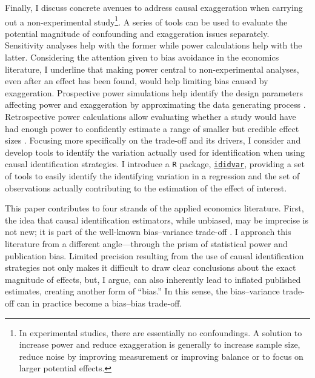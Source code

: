 			Finally, I discuss concrete avenues to address causal exaggeration when carrying out a non-experimental study\footnote{In experimental studies, there are essentially no confoundings. A solution to increase power and reduce exaggeration is generally to increase sample size, reduce noise by improving measurement or improving balance or to focus on larger potential effects.}. A series of tools can be used to evaluate the potential magnitude of confounding and exaggeration issues separately. Sensitivity analyses help with the former while power calculations help with the latter. %
			Considering the attention given to bias avoidance in the economics literature, I underline that making power central to non-experimental analyses, even after an effect has been found, would help limiting bias caused by exaggeration. Prospective power simulations help identify the design parameters affecting power and exaggeration by approximating the data generating process \citep{gelman_regression_2020, black_simulated_2022}. Retrospective power calculations allow evaluating whether a study would have had enough power to confidently estimate a range of smaller but credible effect sizes \citep{gelman_beyond_2014, stommesReliability2023}.
			Focusing more specifically on the trade-off and its drivers, I consider and develop tools to identify the variation actually used for identification when using causal identification strategies. %
			I introduce a \verb?R? package, \href{https://vincentbagilet.github.io/ididvar/}{\verb?ididvar?}, providing a set of tools to easily identify the identifying variation in a regression and the set of observations actually contributing to the estimation of the effect of interest.
						
			This paper contributes to four strands of the applied economics literature. First, the idea that causal identification estimators, while unbiased, may be imprecise is not new; it is part of the well-known bias–variance trade-off \citep{imbens_optimal_2012, deaton_understanding_2018, hernan_causal_2020, ravallion_should_2020}. I approach this literature from a different angle—through the prism of statistical power and publication bias. Limited precision resulting from the use of causal identification strategies not only makes it difficult to draw clear conclusions about the exact magnitude of effects, but, I argue, can also inherently lead to inflated published estimates, creating another form of “bias.” In this sense, the bias–variance trade-off can in practice become a bias–bias trade-off.
			
